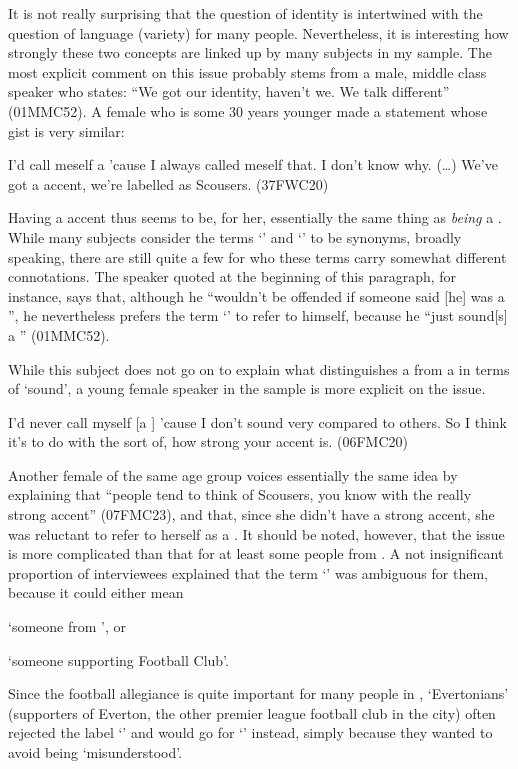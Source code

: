 It is not really surprising that the question of identity is intertwined with the question of language (variety) for many people.
Nevertheless, it is interesting how strongly these two concepts are linked up by many subjects in my sample.
The most explicit comment on this issue probably stems from a male, middle class speaker who states: ``We got our identity, haven't we. We talk different'' (01MMC52).
A female who is some 30 years younger made a statement whose gist is very similar:
\begin{example}
	I'd call meself a  'cause I always called meself that. I don't know why. (\ldots) We've got a  accent, we're labelled as Scousers. (37FWC20)
\end{example}
Having a  accent thus seems to be, for her, essentially the same thing as \emph{being} a .
While many subjects consider the terms `' and `' to be synonyms, broadly speaking, there are still quite a few for who these terms carry somewhat different connotations.
The speaker quoted at the beginning of this paragraph, for instance, says that, although he ``wouldn't be offended if someone said [he] was a '', he nevertheless prefers the term `' to refer to himself, because he ``just sound[s] a '' (01MMC52).

While this subject does not go on to explain what distinguishes a  from a  in terms of `sound', a young female speaker in the sample is more explicit on the issue.
\begin{example}
	I'd never call myself [a ] 'cause I don't sound very  compared to others. So I think it's to do with the sort of, how strong your accent is. (06FMC20)
\end{example}
Another female of the same age group voices essentially the same idea by explaining that ``people tend to think of Scousers, you know with the really strong accent'' (07FMC23), and that, since she didn't have a strong accent, she was reluctant to refer to herself as a .
It should be noted, however, that the issue is more complicated than that for at least some people from .
A not insignificant proportion of interviewees explained that the term `' was ambiguous for them, because it could either mean
\begin{inparaenum}[(1)]
	\item `someone from ', or
	\item `someone supporting  Football Club'.
\end{inparaenum}
Since the football allegiance is quite important for many people in , `Evertonians' (supporters of Everton, the other premier league football club in the city) often rejected the label `' and would go for `' instead, simply because they wanted to avoid being `misunderstood'.

